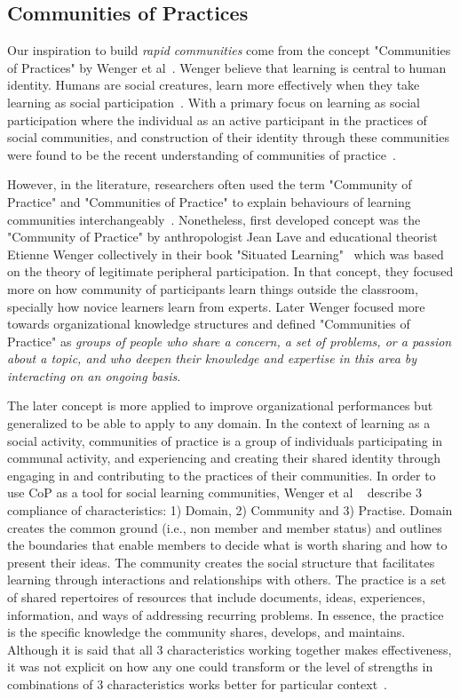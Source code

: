 \documentclass[manuscript,screen,review]{acmart}
\begin{document}
\subsection{Communities of Practices}
Our inspiration to build \textit{rapid communities} come from the concept "Communities of Practices" by Wenger et al~\cite{wenger2010communities}. Wenger believe that learning is central to human identity. Humans are social creatures, learn more effectively when they take learning as social participation~\cite{gauvain2007socialization}. With a primary focus on learning as social participation where the individual as an active participant in the practices of social communities, and construction of their identity through these communities were found to be the recent understanding of communities of practice~\cite{wenger2002cultivating}. 

However, in the literature, researchers often used the term "Community of Practice" and "Communities of Practice" to explain behaviours of learning communities interchangeably~\cite{rogers2000communities}. Nonetheless, first developed concept was the "Community of Practice" by anthropologist Jean Lave and educational theorist Etienne Wenger collectively in their book "Situated Learning"~\cite{lave1991situated} which was based on the theory of legitimate peripheral participation. In that concept, they focused more on how community of participants learn things outside the classroom, specially how novice learners learn from experts. Later Wenger focused more towards organizational knowledge structures and defined "Communities of Practice" as \textit{groups of people who share a concern, a set of problems, or a passion about a topic, and who deepen their knowledge and expertise in this area by interacting on an ongoing basis}\cite{wenger2002cultivating}. 

The later concept is more applied to improve organizational performances but generalized to be able to apply to any domain. In the context of learning as a social activity, communities of practice is a group of individuals participating in communal activity, and experiencing and creating their shared identity through engaging in and contributing to the practices of their communities. In order to use CoP as a tool for social learning communities, Wenger  et al ~\cite{wenger2010communities} describe 3 compliance of characteristics: 1) Domain, 2) Community and 3) Practise. Domain creates the common ground (i.e., non member and member status) and outlines the boundaries that enable members to decide what is worth sharing and how to present their ideas. The community creates the social structure that facilitates learning through interactions and relationships with others. The practice is a set of shared repertoires of resources that include documents, ideas, experiences, information, and ways of addressing recurring problems. In essence, the practice is the specific knowledge the community shares, develops, and maintains. Although it is said that all 3 characteristics working together makes effectiveness, it was not explicit on how any one could transform or the level of strengths in combinations of 3 characteristics works better for particular context~\cite{li2009evolution}. 
\end{document}
